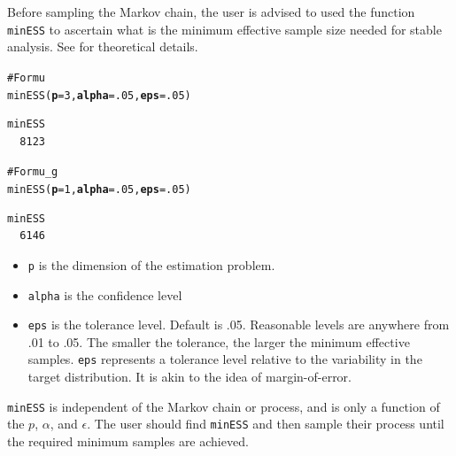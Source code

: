 \documentclass[11pt]{article}\usepackage[]{graphicx}\usepackage[]{color}
\makeatletter
\newcommand{\hlnum}[1]{\textcolor[rgb]{1,0.078,0.576}{#1}}%
\newcommand{\hlcom}[1]{\textcolor[rgb]{0.161,0.161,0.8}{#1}}%
\newcommand{\hlstd}[1]{\textcolor[rgb]{0,0,0}{#1}}%
\newcommand{\hlkwc}[1]{\textcolor[rgb]{0.412,0.412,0.412}{\textbf{#1}}}%
\newcommand{\hlkwd}[1]{\textcolor[rgb]{0,0,0.561}{#1}}%
\newenvironment{kframe}{%
 \def\at@end@of@kframe{}%
 \ifinner\ifhmode%
  \def\at@end@of@kframe{\end{minipage}}%
  \begin{minipage}{\columnwidth}%
 \fi\fi%
 \def\FrameCommand##1{\hskip\@totalleftmargin \hskip-\fboxsep
 \colorbox{shadecolor}{##1}\hskip-\fboxsep
     \hskip-\linewidth \hskip-\@totalleftmargin \hskip\columnwidth}%
 \MakeFramed {\advance\hsize-\width
   \@totalleftmargin\z@ \linewidth\hsize
   \@setminipage}}%
 {\par\unskip\endMakeFramed%
 \at@end@of@kframe}
\newenvironment{knitrout}{}{} %
\makeatother
\begin{document}
Before sampling the Markov chain, the user is advised to used the function \texttt{minESS} to ascertain what is the minimum effective sample size needed for stable analysis. See \cite{vats:fleg:jones:2017b} for theoretical details.
\begin{knitrout}
\color{fgcolor}\begin{kframe}
\begin{alltt}
\hlcom{# For mu}
\hlkwd{minESS}\hlstd{(}\hlkwc{p} \hlstd{=} \hlnum{3}\hlstd{,} \hlkwc{alpha} \hlstd{=} \hlnum{.05}\hlstd{,} \hlkwc{eps} \hlstd{=} \hlnum{.05}\hlstd{)}
\end{alltt}
\begin{verbatim}
minESS 
  8123 
\end{verbatim}
\begin{alltt}
\hlcom{#For mu_g}
\hlkwd{minESS}\hlstd{(}\hlkwc{p} \hlstd{=} \hlnum{1}\hlstd{,} \hlkwc{alpha} \hlstd{=} \hlnum{.05}\hlstd{,} \hlkwc{eps} \hlstd{=} \hlnum{.05}\hlstd{)}
\end{alltt}
\begin{verbatim}
minESS 
  6146 
\end{verbatim}
\end{kframe}
\end{knitrout}

\begin{itemize}
	\item \texttt{p} is the dimension of the estimation problem.
	\item \texttt{alpha} is the confidence level
	\item \texttt{eps} is the tolerance level. Default is .05. Reasonable levels are anywhere from .01 to .05. The smaller the tolerance, the larger the minimum effective samples. \texttt{eps} represents a tolerance level relative to the variability in the target distribution. It is akin to the idea of margin-of-error.
\end{itemize}

\texttt{minESS} is independent of the Markov chain or process, and is only a function of the  $p$, $\alpha$, and $\epsilon$. The user should find \texttt{minESS} and then sample their process until the required minimum samples are achieved. 
\end{document}
